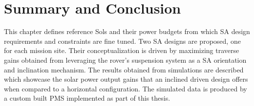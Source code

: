 \section{Summary and Conclusion}
\label{sec:Design:SummaryAndConclusion}
This chapter defines reference Sols and their power budgets from which \ac{SA} design requirements and constraints are fine tuned. Two \ac{SA} designs are proposed, one for each mission site. Their conceptualization is driven by maximizing traverse gains obtained from leveraging the rover's suspension system as a \ac{SA} orientation and inclination mechanism. The results obtained from simulations are described which showcase the solar power output gains that an inclined driven design offers when compared to a horizontal configuration. The simulated data is produced by a custom built \ac{PMS} implemented as part of this thesis.
